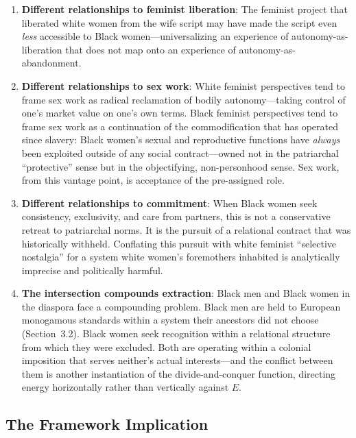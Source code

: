 \documentclass[12pt,openany]{book}
\begin{document}
\begin{enumerate}
    \item \textbf{Different relationships to feminist liberation}: The feminist project that liberated white women from the wife script may have made the script even \textit{less} accessible to Black women---universalizing an experience of autonomy-as-liberation that does not map onto an experience of autonomy-as-abandonment.
    
    \item \textbf{Different relationships to sex work}: White feminist perspectives tend to frame sex work as radical reclamation of bodily autonomy---taking control of one's market value on one's own terms. Black feminist perspectives tend to frame sex work as a continuation of the commodification that has operated since slavery: Black women's sexual and reproductive functions have \textit{always} been exploited outside of any social contract---owned not in the patriarchal ``protective'' sense but in the objectifying, non-personhood sense. Sex work, from this vantage point, is acceptance of the pre-assigned role.
    
    \item \textbf{Different relationships to commitment}: When Black women seek consistency, exclusivity, and care from partners, this is not a conservative retreat to patriarchal norms. It is the pursuit of a relational contract that was historically withheld. Conflating this pursuit with white feminist ``selective nostalgia'' for a system white women's foremothers inhabited is analytically imprecise and politically harmful.
    
    \item \textbf{The intersection compounds extraction}: Black men and Black women in the diaspora face a compounding problem. Black men are held to European monogamous standards within a system their ancestors did not choose (Section~3.2). Black women seek recognition within a relational structure from which they were excluded. Both are operating within a colonial imposition that serves neither's actual interests---and the conflict between them is another instantiation of the divide-and-conquer function, directing energy horizontally rather than vertically against $E$.
\end{enumerate}

\subsection{The Framework Implication}
\end{document}
